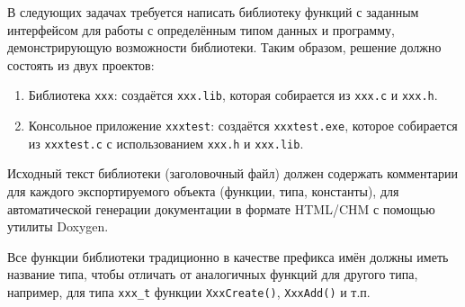 
В следующих задачах требуется написать библиотеку функций с заданным
интерфейсом для работы с определённым типом данных и программу,
демонстрирующую возможности библиотеки. Таким образом, решение должно состоять
из двух проектов:
%
\begin{enumerate}
\item Библиотека \texttt{xxx}: создаётся \texttt{xxx.lib},
      которая собирается из \texttt{xxx.c} и \texttt{xxx.h}.
\item Консольное приложение \texttt{xxxtest}: создаётся \texttt{xxxtest.exe},
      которое собирается из \texttt{xxxtest.c}
      с использованием \texttt{xxx.h} и \texttt{xxx.lib}.
\end{enumerate}

Исходный текст библиотеки (заголовочный файл) должен содержать комментарии для
каждого экспортируемого объекта (функции, типа, константы), для автоматической
генерации документации в формате HTML/CHM с помощью утилиты Doxygen.%

Все функции библиотеки традиционно в качестве префикса имён должны иметь
название типа, чтобы отличать от аналогичных функций для другого типа,
например, для типа \texttt{xxx\_t} функции \texttt{XxxCreate()},
\texttt{XxxAdd()} и т.п.


\zzsectionCOMMENTS


